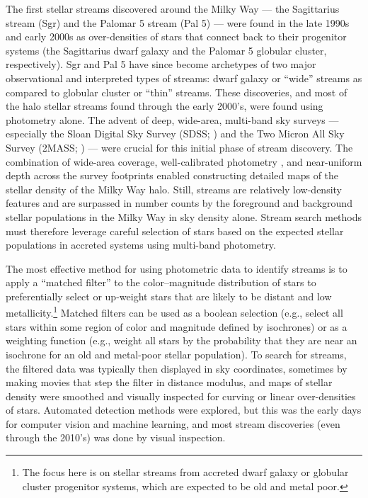 \documentclass[final,5p,times,twocolumn,authoryear]{elsarticle}
\begin{document}
The first stellar streams discovered around the Milky Way --- the Sagittarius stream
(Sgr) and the Palomar 5 stream (Pal 5) --- were found in the late 1990s and early 2000s
as over-densities of stars that connect back to their progenitor systems (the
Sagittarius dwarf galaxy and the Palomar 5 globular cluster, respectively).
Sgr and Pal 5 have since become archetypes of two major observational and interpreted
types of streams: dwarf galaxy or ``wide'' streams as compared to globular cluster or
``thin'' streams.
These discoveries, and most of the halo stellar streams found through the early 2000's,
were found using photometry alone.
The advent of deep, wide-area, multi-band sky surveys --- especially the Sloan Digital
Sky Survey (SDSS; \citealt{york:2000, gunn:1998, fukugita:1996}) and the Two Micron All
Sky Survey (2MASS; \citealt{skrutskie:2006}) --- were crucial for this initial phase of
stream discovery.
The combination of wide-area coverage, well-calibrated photometry
\citep{padmanabhan:2008}, and near-uniform depth across the survey footprints enabled
constructing detailed maps of the stellar density of the Milky Way halo.
Still, streams are relatively low-density features and are surpassed in number counts by
the foreground and background stellar populations in the Milky Way in sky density alone.
Stream search methods must therefore leverage careful selection of stars based on the
expected stellar populations in accreted systems using multi-band photometry.

The most effective method for using photometric data to identify streams is to apply a
``matched filter'' \citep{rockosi:2002} to the color--magnitude distribution of stars
to preferentially select or up-weight stars that are likely to be distant and low
metallicity.\footnote{The focus here is on stellar streams from accreted dwarf galaxy or
globular cluster progenitor systems, which are expected to be old and metal poor.}
Matched filters can be used as a boolean selection (e.g., select all stars within some
region of color and magnitude defined by isochrones) or as a weighting function (e.g.,
weight all stars by the probability that they are near an isochrone for an old and
metal-poor stellar population).
To search for streams, the filtered data was typically then displayed in sky
coordinates, sometimes by making movies that step the filter in distance modulus, and
maps of stellar density were smoothed and visually inspected for curving or linear
over-densities of stars.
Automated detection methods were explored, but this was the early days for computer
vision and machine learning, and most stream discoveries (even through the 2010's) was
done by visual inspection.
\end{document}
